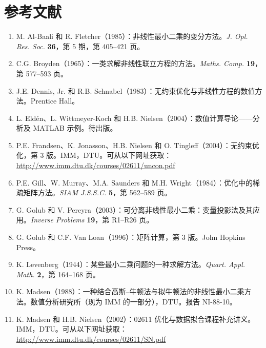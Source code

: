 \chapter*{参考文献}
\begin{enumerate}[label={\arabic*.},leftmargin=2.3em,itemsep=0.6em]
 \item M. Al-Baali 和 R. Fletcher（1985）：非线性最小二乘的变分方法。\emph{J. Opl. Res. Soc.} \textbf{36}，第 5 期，第 405--421 页。
 \item C.G. Broyden（1965）：一类求解非线性联立方程的方法。\emph{Maths. Comp.} \textbf{19}，第 577--593 页。
 \item J.E. Dennis, Jr. 和 R.B. Schnabel（1983）：无约束优化与非线性方程的数值方法。Prentice Hall。
 \item L. Eldén、L. Wittmeyer-Koch 和 H.B. Nielsen（2004）：数值计算导论——分析及 MATLAB 示例。待出版。
 \item P.E. Frandsen、K. Jonasson、H.B. Nielsen 和 O. Tingleff（2004）：无约束优化，第 3 版。IMM，DTU。可从以下网址获取：\\
 \url{http://www.imm.dtu.dk/courses/02611/uncon.pdf}
 \item P.E. Gill、W. Murray、M.A. Saunders 和 M.H. Wright（1984）：优化中的稀疏矩阵方法。\emph{SIAM J.S.S.C.} \textbf{5}，第 562--589 页。
 \item G. Golub 和 V. Pereyra（2003）：可分离非线性最小二乘：变量投影法及其应用。\emph{Inverse Problems} \textbf{19}，第 R1--R26 页。
 \item G. Golub 和 C.F. Van Loan（1996）：矩阵计算，第 3 版。John Hopkins Press。
 \item K. Levenberg（1944）：某些最小二乘问题的一种求解方法。\emph{Quart. Appl. Math.} \textbf{2}，第 164--168 页。
 \item K. Madsen（1988）：一种结合高斯--牛顿法与拟牛顿法的非线性最小二乘方法。数值分析研究所（现为 IMM 的一部分），DTU。报告 NI-88-10。
 \item K. Madsen 和 H.B. Nielsen（2002）：02611 优化与数据拟合课程补充讲义。IMM，DTU。可从以下网址获取：\\
 \url{http://www.imm.dtu.dk/courses/02611/SN.pdf}
\end{enumerate}

